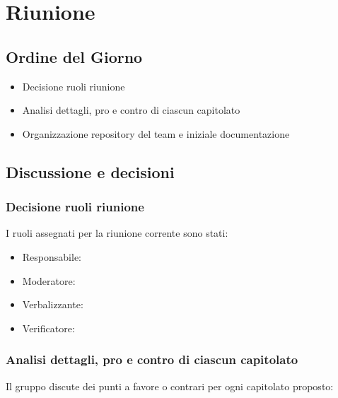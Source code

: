 \section{Riunione}
\subsection{Ordine del Giorno}
\begin{itemize}
	\item Decisione ruoli riunione
	\item Analisi dettagli, pro e contro di ciascun capitolato
	\item Organizzazione repository del team e iniziale documentazione
\end{itemize}

\subsection{Discussione e decisioni}

\subsubsection{Decisione ruoli riunione}
I ruoli assegnati per la riunione corrente sono stati:
\begin{itemize}
	\item Responsabile: \sebastiano
	\item Moderatore: \stocco
	\item Verbalizzante: \raul
	\item Verificatore: \martina
\end{itemize}

\subsubsection{Analisi dettagli, pro e contro di ciascun capitolato}
Il gruppo discute dei punti a favore o contrari per ogni capitolato proposto:

